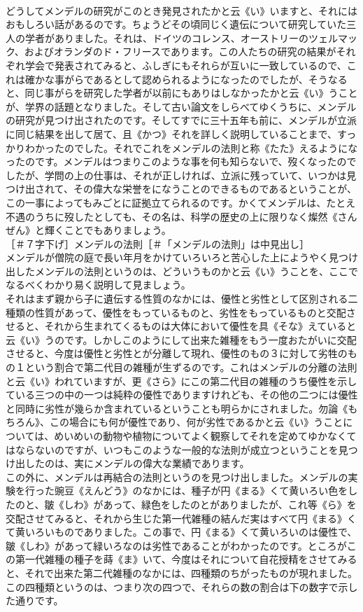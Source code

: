 \documentclass[8pt]{extreport}
\begin{document}
\begin{CJK}{UTF8}{min}
\\	どうしてメンデルの研究がこのとき発見されたかと云《い》いますと、それにはおもしろい話があるのです。ちょうどその頃同じく遺伝について研究していた三人の学者がありました。それは、ドイツのコレンス、オーストリーのツェルマック、およびオランダのド・フリースであります。この人たちの研究の結果がそれぞれ学会で発表されてみると、ふしぎにもそれらが互いに一致しているので、これは確かな事がらであるとして認められるようになったのでしたが、そうなると、同じ事がらを研究した学者が以前にもありはしなかったかと云《い》うことが、学界の話題となりました。そして古い論文をしらべてゆくうちに、メンデルの研究が見つけ出されたのです。そしてすでに三十五年も前に、メンデルが立派に同じ結果を出して居て、且《かつ》それを詳しく説明していることまで、すっかりわかったのでした。それでこれをメンデルの法則と称《たた》えるようになったのです。メンデルはつまりこのような事を何も知らないで、歿くなったのでしたが、学問の上の仕事は、それが正しければ、立派に残っていて、いつかは見つけ出されて、その偉大な栄誉をになうことのできるものであるということが、この一事によってもみごとに証拠立てられるのです。かくてメンデルは、たとえ不遇のうちに歿したとしても、その名は、科学の歴史の上に限りなく燦然《さんぜん》と輝くことでもありましょう。
\\	［＃７字下げ］メンデルの法則［＃「メンデルの法則」は中見出し］
\\	メンデルが僧院の庭で長い年月をかけていろいろと苦心した上にようやく見つけ出したメンデルの法則というのは、どういうものかと云《い》うことを、ここでなるべくわかり易く説明して見ましょう。
\\	それはまず親から子に遺伝する性質のなかには、優性と劣性として区別される二種類の性質があって、優性をもっているものと、劣性をもっているものと交配させると、それから生まれてくるものは大体において優性を具《そな》えていると云《い》うのです。しかしこのようにして出来た雑種をもう一度おたがいに交配させると、今度は優性と劣性とが分離して現れ、優性のもの３に対して劣牲のもの１という割合で第二代目の雑種が生ずるのです。これはメンデルの分離の法則と云《い》われていますが、更《さら》にこの第二代目の雑種のうち優性を示している三つの中の一つは純粋の優性でありますけれども、その他の二つには優性と同時に劣性が幾らか含まれているということも明らかにされました。勿論《もちろん》、この場合にも何が優性であり、何が劣性であるかと云《い》うことについては、めいめいの動物や植物についてよく観察してそれを定めてゆかなくてはならないのですが、いつもこのような一般的な法則が成立つということを見つけ出したのは、実にメンデルの偉大な業績であります。
\\	この外に、メンデルは再結合の法則というのを見つけ出しました。メンデルの実験を行った豌豆《えんどう》のなかには、種子が円《まる》くて黄いろい色をしたのと、皺《しわ》があって、緑色をしたのとがありましたが、これ等《ら》を交配させてみると、それから生じた第一代雑種の結んだ実はすべて円《まる》くて黄いろいものでありました。この事で、円《まる》くて黄いろいのは優性で、皺《しわ》があって緑いろなのは劣性であることがわかったのです。ところがこの第一代雑種の種子を蒔《ま》いて、今度はそれについて自花授精をさせてみると、それで出来た第二代雑種のなかには、四種類のちがったものが現れました。この四種類というのは、つまり次の四つで、それらの数の割合は下の数字で示した通りです。

\end{CJK}
\end{document}

